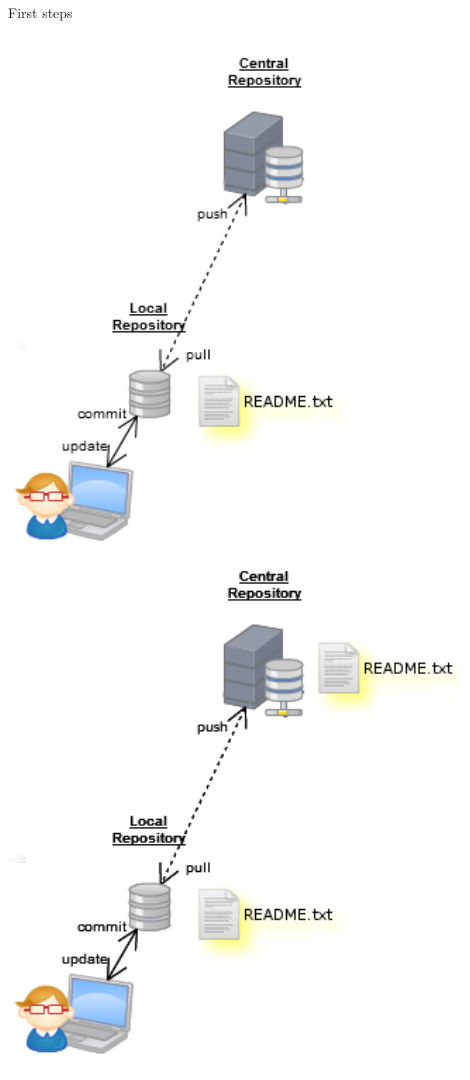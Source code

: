 \begin{frame}[fragile]{First steps}
\begin{columns}
\begin{column}{0.4\textwidth}
\begin{center}
{				}\only<5> {
					\includegraphics[width=0.9\textwidth]{commit.png}
				}\only<6> {
					\includegraphics[width=0.9\textwidth]{push.png}
				}
			\end{center}
		\end{column}
	\end{columns}
\end{frame}


